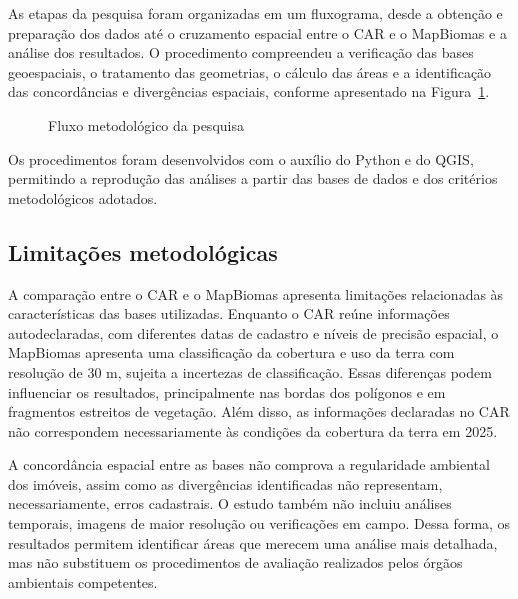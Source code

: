 As etapas da pesquisa foram organizadas em um fluxograma, desde a obtenção e preparação dos dados até o cruzamento espacial entre o CAR e o MapBiomas e a análise dos resultados. O procedimento compreendeu a verificação das bases geoespaciais, o tratamento das geometrias, o cálculo das áreas e a identificação das concordâncias e divergências espaciais, conforme apresentado na Figura~\ref{fig:fluxo}.

\begin{figure}[H]
\centering
\caption{Fluxo metodológico da pesquisa}
\label{fig:fluxo}
\end{figure}

Os procedimentos foram desenvolvidos com o auxílio do Python e do QGIS, permitindo a reprodução das análises a partir das bases de dados e dos critérios metodológicos adotados.

\subsection{Limitações metodológicas}

A comparação entre o CAR e o MapBiomas apresenta limitações relacionadas às características das bases utilizadas. Enquanto o CAR reúne informações autodeclaradas, com diferentes datas de cadastro e níveis de precisão espacial, o MapBiomas apresenta uma classificação da cobertura e uso da terra com resolução de 30 m, sujeita a incertezas de classificação. Essas diferenças podem influenciar os resultados, principalmente nas bordas dos polígonos e em fragmentos estreitos de vegetação. Além disso, as informações declaradas no CAR não correspondem necessariamente às condições da cobertura da terra em 2025.

A concordância espacial entre as bases não comprova a regularidade ambiental dos imóveis, assim como as divergências identificadas não representam, necessariamente, erros cadastrais. O estudo também não incluiu análises temporais, imagens de maior resolução ou verificações em campo. Dessa forma, os resultados permitem identificar áreas que merecem uma análise mais detalhada, mas não substituem os procedimentos de avaliação realizados pelos órgãos ambientais competentes.

\newpage
